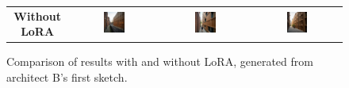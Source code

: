 \begin{figure}[H]
{\begin{tabular}{c c c c}
    \textbf{Without LoRA} &
    \includegraphics[width=0.25\textwidth]{Images/Results/Architect-B_unstructured-phase/generated_images/1/Zonder_lora_00001_.png} &
    \includegraphics[width=0.25\textwidth]{Images/Results/Architect-B_unstructured-phase/generated_images/1/Zonder_lora_00002_.png} & \includegraphics[width=0.25\textwidth]{Images/Results/Architect-B_unstructured-phase/generated_images/1/Zonder_lora_00003_.png} \\
  \end{tabular}
  }
  \caption{Comparison of results with and without LoRA, generated from architect B's first sketch.}
  \label{fig:lora-comparison-2wide}
\end{figure}

